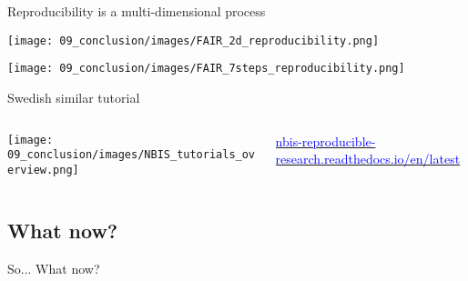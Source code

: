 \begin{frame}{\FAIRB}

Reproducibility is a multi-dimensional process

\begin{center}
    \texttt{[image: 09\_conclusion/images/FAIR\_2d\_reproducibility.png]}
\end{center}

\end{frame}

\begin{frame}{\FAIRB}

\begin{center}
    \texttt{[image: 09\_conclusion/images/FAIR\_7steps\_reproducibility.png]}
\end{center}

\end{frame}

\begin{frame}{Swedish similar tutorial}
\begin{columns}
\begin{column}{0.6\textwidth}
\begin{center}
    \texttt{[image: 09\_conclusion/images/NBIS\_tutorials\_overview.png]}
\end{center}
\end{column}
\begin{column}{0.3\textwidth}
\begin{center}
    \href{https://nbis-reproducible-research.readthedocs.io/en/latest/ 
    }{\textcolor{blue}{nbis-reproducible-research.readthedocs.io/en/latest}}
\end{center}
\end{column}
\end{columns}
\end{frame}

\subsection{What now?}

\begin{frame}{}

\huge{So... What now?}

\end{frame}

